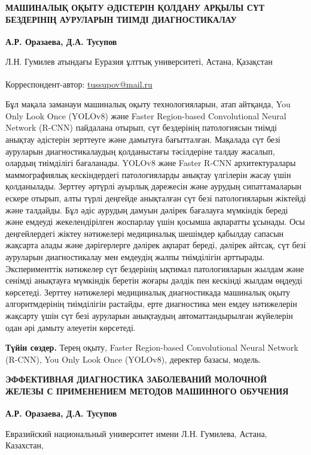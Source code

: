 
{\bfseries МАШИНАЛЫҚ ОҚЫТУ ӘДІСТЕРІН ҚОЛДАНУ АРҚЫЛЫ СҮТ БЕЗДЕРІНІҢ
АУРУЛАРЫН ТИІМДІ ДИАГНОСТИКАЛАУ}

{\bfseries А.Р. Оразаева, Д.А. Тусупов\textsuperscript{\envelope }}

Л.Н. Гумилев атындағы Еуразия ұлттық университеті, Астана, Қазақстан

{\bfseries \textsuperscript{\envelope }}Корреспондент-автор:
\href{mailto:oaris.83@gmail.com}{tussupov@mail.ru}

Бұл мақала заманауи машиналық оқыту технологияларын, атап айтқанда, You
Only Look Once (YOLOv8) және Faster Region-based Convolutional Neural
Network (R-CNN) пайдалана отырып, сүт бездерінің патологиясын тиімді
анықтау әдістерін зерттеуге және дамытуға бағытталған. Мақалада сүт безі
ауруларын диагностикалаудың қолданыстағы тәсілдеріне талдау жасалып,
олардың тиімділігі бағаланады. YOLOv8 және Faster R-CNN архитектуралары
маммографиялық кескіндердегі патологияларды анықтау үлгілерін жасау үшін
қолданылады. Зерттеу әртүрлі ауырлық дәрежесін және аурудың
сипаттамаларын ескере отырып, алты түрлі деңгейде анықталған сүт безі
патологияларын жіктейді және талдайды. Бұл әдіс аурудың дамуын дәлірек
бағалауға мүмкіндік береді және емдеуді жекелендірілген жоспарлау үшін
қосымша ақпаратты ұсынады. Осы деңгейлердегі жіктеу нәтижелері
медициналық шешімдер қабылдау сапасын жақсарта алады және дәрігерлерге
дәлірек ақпарат береді, дәлірек айтсақ, сүт безі ауруларын
диагностикалау мен емдеудің жалпы тиімділігін арттырады. Эксперименттік
нәтижелер сүт бездерінің ықтимал патологияларын жылдам және сенімді
анықтауға мүмкіндік беретін жоғары дәлдік пен кескінді жылдам өңдеуді
көрсетеді. Зерттеу нәтижелері медициналық диагностикада машиналық оқыту
алгоритмдерінің тиімділігін растайды, ерте диагностика мен емдеу
нәтижелерін жақсарту үшін сүт безі ауруларын анықтаудың
автоматтандырылған жүйелерін одан әрі дамыту әлеуетін көрсетеді.

{\bfseries Түйін сөздер.} Терең оқыту, Faster Region-based Convolutional
Neural Network (R-CNN), You Only Look Once (YOLOv8), деректер базасы,
модель.

{\bfseries ЭФФЕКТИВНАЯ ДИАГНОСТИКА ЗАБОЛЕВАНИЙ МОЛОЧНОЙ ЖЕЛЕЗЫ С
ПРИМЕНЕНИЕМ МЕТОДОВ МАШИННОГО ОБУЧЕНИЯ}

{\bfseries А.Р. Оразаева, Д.А. Тусупов \textsuperscript{\envelope }}

Евразийский национальный университет имени Л.Н. Гумилева, Астана,
Казахстан,


